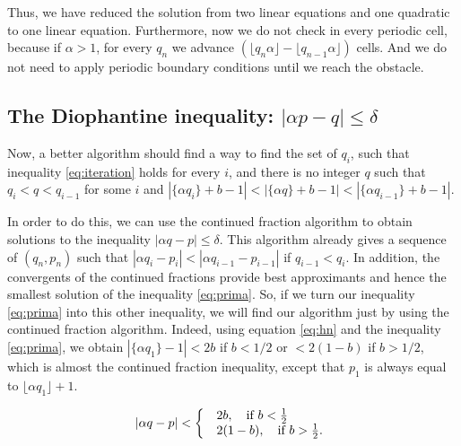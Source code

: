 \documentclass[pre,amsmath,amssymb, twocolumn, showpacs]{revtex4-1}
\begin{document}
Thus, we have reduced the solution from two linear equations and one quadratic to one linear equation.
Furthermore, now we do not check in every periodic cell, because if $\alpha >1$,
for every $q_n$ we advance $(\lfloor q_{n}\alpha \rfloor -\lfloor q_{n-1}\alpha \rfloor)$ cells. 
And we do not need to apply periodic boundary conditions until we reach the obstacle. 

\subsection{The Diophantine inequality: $|\alpha p - q|\leq \delta$}

Now, a better algorithm should find a way to find the set of $q_i$, such that inequality \eqref{eq:iteration} holds for every $i$, and there is no integer $q$  such that $q_i<q<q_{i-1}$ for some $i$ and
$|\{ \alpha  q_i \}+b -1|<|\{ \alpha  q \}+b -1| <|\{ \alpha  q_{i-1} \}+b -1|$. 

In order to do this, we can use the continued fraction algorithm to obtain solutions to the inequality $|\alpha q - p|\leq \delta$. This algorithm already gives a sequence of $(q_n,p_n)$ such that $|\alpha q_i - p_i|<|\alpha q_{i-1} - p_{i-1}|$ if $q_{i-1} <q_i$. In addition, the convergents of the continued fractions provide best approximants and hence the smallest solution of the inequality \eqref{eq:prima}.
So, if we turn our inequality \eqref{eq:prima} into this other inequality, we will find our algorithm just by using the continued fraction algorithm.
Indeed, using equation \eqref{eq:hn} and the inequality \eqref{eq:prima}, we obtain $|\{ \alpha  q_1 \} -1|< 2b$ if $b < 1/2$ or $<  2(1-b)$  if $b > 1/2$, 
which is almost the continued fraction inequality, except that $p_1$ is always equal to $\lfloor \alpha q_1  \rfloor+1$. 


\begin{eqnarray}
    | \alpha q - p | < 
 \left\{ 
  \begin{array}{@{}l@{\quad}l}
 & 2b, \quad \mbox{if } b < \frac{1}{2} \\ 
& 2(1-b), \quad  \mbox{if }  b > \frac{1}{2}.
   \end{array}
   \right.
\label{eq:master2}
\end{eqnarray}
\end{document}
